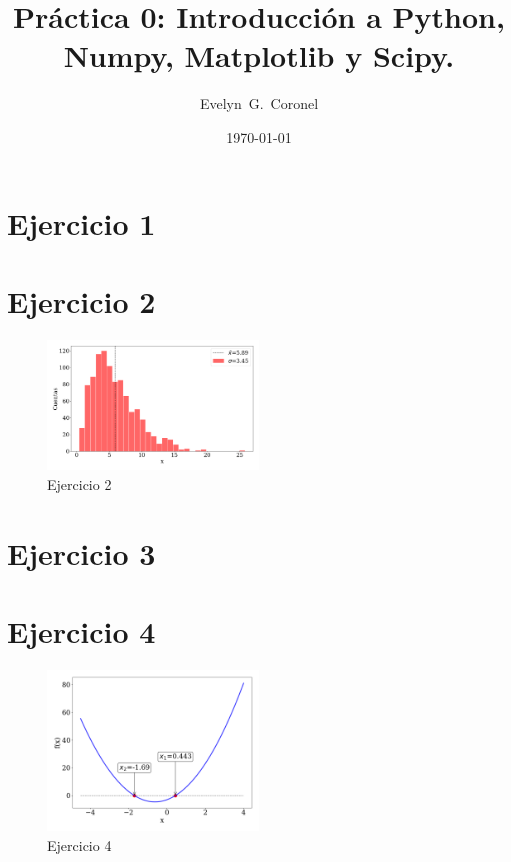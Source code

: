 



\title{Práctica 0: Introducción a Python, Numpy, Matplotlib y Scipy.}
\author{Evelyn~G.~Coronel}


\date[]{\lowercase{\today}} %


\maketitle


\section*{Ejercicio 1}


\section*{Ejercicio 2}

\begin{figure}[H]
	\centering
	\includegraphics[width=0.5\textwidth]{ejer_2.png}
	\caption{Ejercicio 2}
	\label{fig:ejer2}
\end{figure}
	

\section*{Ejercicio 3}


\section*{Ejercicio 4}

\begin{figure}[H]
	\centering
	\includegraphics[width=0.5\textwidth]{ejer_4.png}
	\caption{Ejercicio 4}
	\label{fig:ejer4}
\end{figure}
	

